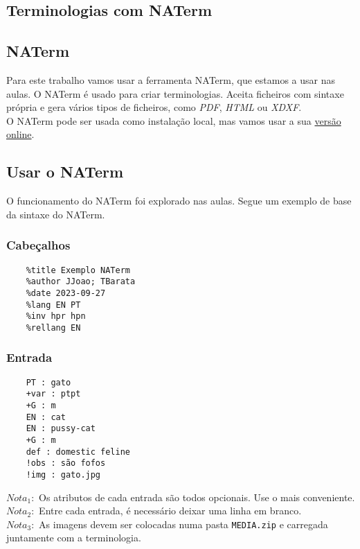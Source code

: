 \documentclass[10pt,a4paper,notitlepage]{article}
\begin{document}
\begin{center}
\section*{Terminologias com NATerm}
\end{center}

\subsection*{NATerm}
Para este trabalho vamos usar a ferramenta NATerm, que estamos a usar nas aulas. O NATerm é usado para criar terminologias. Aceita ficheiros com sintaxe própria e gera vários tipos de ficheiros, como \textit{PDF}, \textit{HTML} ou \textit{XDXF}. 
\\
O NATerm pode ser usada como instalação local, mas vamos usar a sua \href{https://natura.di.uminho.pt/jjbin/naterm}{versão online}.

\subsection*{Usar o NATerm}
O funcionamento do NATerm foi explorado nas aulas. Segue um exemplo de base da sintaxe do NATerm.

\subsubsection*{Cabeçalhos}
\begin{Verbatim}
    %title Exemplo NATerm
    %author JJoao; TBarata
    %date 2023-09-27
    %lang EN PT
    %inv hpr hpn
    %rellang EN
\end{Verbatim}

\subsubsection*{Entrada}
\begin{Verbatim}
    PT : gato
    +var : ptpt
    +G : m
    EN : cat
    EN : pussy-cat
    +G : m
    def : domestic feline
    !obs : são fofos
    !img : gato.jpg
\end{Verbatim}
$Nota_1:$ Os atributos de cada entrada são todos opcionais. Use o mais conveniente.
\\
$Nota_2:$ Entre cada entrada, é necessário deixar uma linha em branco.
\\
$Nota_3:$ As imagens devem ser colocadas numa pasta \texttt{MEDIA.zip} e carregada juntamente com a terminologia.
\end{document}
